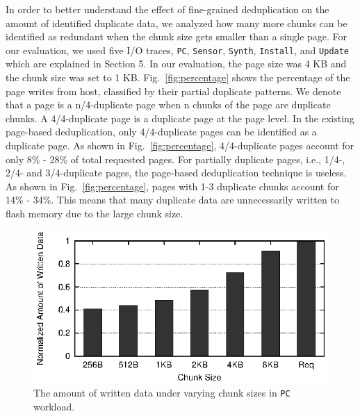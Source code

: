 In order to better understand the effect of fine-grained deduplication on the amount of identified duplicate data,
we analyzed how many more chunks can be identified as redundant 
when the chunk size gets smaller than a single page.
For our evaluation, we used five I/O traces, \texttt{PC}, \texttt{Sensor}, \texttt{Synth}, \texttt{Install}, and \texttt{Update} which are 
explained in Section 5.
In our evaluation, the page size was 4 KB and the chunk size was set to 1 KB.
Fig.~\ref{fig:percentage} shows the percentage of the page writes from host, classified by their partial duplicate patterns.
We denote that a page is a n/4-duplicate page when n chunks of the page are duplicate chunks.
A 4/4-duplicate page is a duplicate page at the page level.
In the existing page-based deduplication, only 4/4-duplicate pages can be identified as a duplicate page.
As shown in Fig.~\ref{fig:percentage}, 4/4-duplicate pages account for only 8\% - 28\% of total requested pages.
For partially duplicate pages, i.e., 1/4-, 2/4- and 3/4-duplicate pages, the page-based deduplication technique is useless.
As shown in Fig.~\ref{fig:percentage},
pages with 1-3 duplicate chunks account for 14\% - 34\%.
This means that many duplicate data are unnecessarily written to flash memory
due to the large chunk size.

\begin{figure}[t]
	\center
	\includegraphics[scale=1]{figure/finededup/nonDuplicatedData_ChunkSize}
	\caption{The amount of written data under varying chunk sizes in \texttt{PC} workload.} %
	\label{fig:chunksize}
\end{figure}

